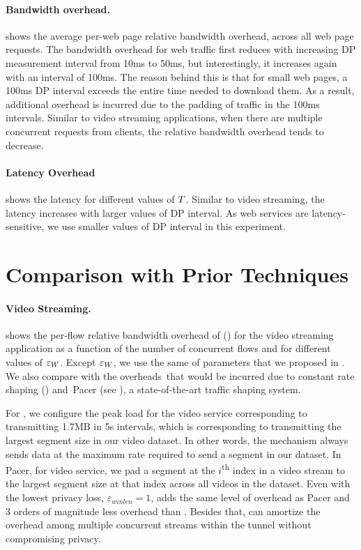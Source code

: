 \paragraph{Bandwidth overhead.}
 shows the average per-web page relative bandwidth overhead, across all web page requests.
The bandwidth overhead for web traffic first reduces with increasing DP measurement interval from 10ms to 50ms, but interestingly, it increases again
with an interval of 100ms.
The reason behind this is that for small web pages, a 100ms DP interval exceeds the entire time needed to download them.
As a result, additional overhead is incurred due to the padding of traffic in the 100ms intervals.
Similar to video streaming applications, when there are multiple concurrent requests from clients, the relative bandwidth overhead tends to decrease.

\paragraph{Latency Overhead}
 shows the latency for different values of $T$.
Similar to video streaming, the latency increases with larger values of DP interval.
As web services are latency-sensitive, we use smaller values of DP interval in this experiment. 

\section{Comparison with Prior Techniques}\label{sec:eval-comparison-others}
\paragraph{Video Streaming.}
 shows the per-flow relative bandwidth overhead of {\sys} ({\ns}) for the video streaming application as a function of the number of concurrent flows and for different values of $\varepsilon_{W}$.
Except $\varepsilon_{W}$, we use the same of parameters that we proposed in .
We also compare with the overheads~that would be incurred due to constant rate
shaping ({\constshape}) and~Pacer \cite{mehta2022pacer} (see ), a state-of-the-art traffic shaping system.

For {\constshape}, we configure the peak load for the video service corresponding to
transmitting 1.7MB in 5s intervals, which is corresponding to transmitting the largest segment size in our video dataset. In other words, the {\constshape} mechanism always sends data at the maximum rate required to send a segment in our dataset.
In Pacer, for video service, we pad a segment at the $i$\textsuperscript{th} index
in a video stream to the largest segment size at that index across all videos in the dataset. 
Even with the lowest privacy loss, $\varepsilon_{winlen}=1$, {\ns} adds the same level of overhead as Pacer and 3 orders of magnitude less overhead than {\constshape}.  
Besides that, {\ns} can amortize the overhead
among multiple concurrent streams within the tunnel without compromising privacy.

